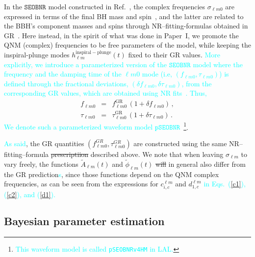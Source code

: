 \documentclass[twocolumn,prd,aps,superscriptaddress,preprintnumbers,tightenlines,showpacs,nofootinbib,eqsecnum,amsfonts,amsmath]{revtex4-1}
\newcommand{\paperone}{Paper~I\xspace}
\newcommand{\ab}[1]{\textcolor{cyan}{#1}}
\newcommand{\pSEOB}{\texttt{pSEOBNR}}
\newcommand{\SEOB}{\texttt{SEOBNR}}
\begin{document}
In the $\SEOB$ model constructed in Ref.~\cite{Cotesta:2018fcv}, the
complex frequencies $\sigma_{\ell m 0}$ are expressed in terms of the
final BH mass and spin~\cite{Berti:2005ys,Berti:2009kk}, and the
latter are related to the BBH's component masses and spins through
NR--fitting-formulas obtained in
GR~\cite{Taracchini:2013rva,Hofmann:2016yih}. Here instead, in the
spirit of what was done in \paperone, we promote the QNM (complex)
frequencies to be free parameters of the model, while keeping the
inspiral-plunge modes $h_{\ell m}^\mathrm{inspiral-plunge}(t)$ fixed
to their GR values. \ab{More explicitly, we introduce a parameterized 
version of the $\SEOB$ model where the frequency and the
damping time of the ${\ell m 0}$ mode (i.e, $(f_{\ell m 0}, \tau
_{\ell m 0})$) is defined through the fractional deviations, $(\delta
f_{\ell m 0},\delta \tau_{\ell m 0})$, from the corresponding GR
values, which are obtained using NR fits~\cite{Taracchini:2013rva,Hofmann:2016yih}. Thus,} 
\begin{eqnarray}
f_{\ell m 0} &=& f_{\ell m 0}^{\text{GR}}\, (1 + \delta f_{\ell m 0})\,,\label{eq:nongr_freqs_a} \\ 
\tau _{\ell m 0} &=& \tau _{\ell m 0}^{\text{GR}}\, (1 + \delta \tau_{\ell m 0})\,. \label{eq:nongr_freqs_b}
\end{eqnarray}
\ab{We denote such a parameterized waveform model $\pSEOB$}~\footnote{\ab{This 
waveform model is called {\tt pSEOBNRv4HM} in LAL.}}.

\ab{As said}, the GR quantities $( f_{\ell m 0}^{GR},\tau_{\ell m 0}^{GR})$ are
constructed using the same NR--fitting--formula \sout{prescriptiion} 
described above. We note that when leaving $\sigma_{\ell m}$ to vary
freely, the functions $\tilde{A}_{\ell m}(t)$ and $\tilde{\phi}_{\ell
  m}(t)$ \sout{will} in general also differ from the GR prediction\ab{s}, since
those functions depend on the QNM complex frequencies, as can be seen
from the expressions for $c_{i,c}^{\ell m}$ and $d_{1,c}^{\ell m}$ \ab{in Eqs.~(\ref{c1}), 
(\ref{c2}), and (\ref{d1}).}


\subsection{Bayesian parameter estimation}\label{sec:method}
\end{document}
